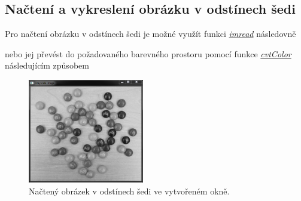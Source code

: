 \documentclass[12pt, a4paper]{article}
\begin{document}
\subsection{Načtení a vykreslení obrázku v odstínech šedi}

\par{Pro načtení obrázku v odstínech šedi je možné využít funkci \href{http://docs.opencv.org/modules/highgui/doc/reading_and_writing_images_and_video.html?highlight=imread#cv2.imread}{\textit{imread}} následovně

nebo jej převést do požadovaného barevného prostoru pomocí funkce \href{http://docs.opencv.org/modules/imgproc/doc/miscellaneous_transformations.html?highlight=cvtcolor#cv2.cvtColor}{\textit{cvtColor}} následujícím způsobem


\begin{figure}[!ht]
	\centering
	\includegraphics[width=0.45\textwidth]{GS_image.png}
	\caption{Načtený obrázek v odstínech šedi ve vytvořeném okně.}	
\end{figure}

}
\end{document}
